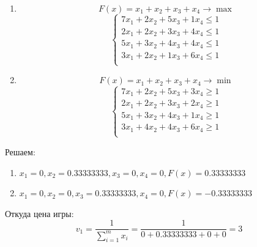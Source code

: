 \documentclass[9pt, a4paper]{article}
\begin{document}
    \begin{enumerate}
        \item
        \begin{equation}
            F(x) = x_1 + x_2 + x_3 + x_4 \rightarrow \max\label{eq:equation34}
        \end{equation}
        \begin{equation}
            \begin{cases}
                7x_1 + 2x_2 + 5x_3 + 1x_4 \leqslant 1\\
                2x_1 + 2x_2 + 3x_3 + 4x_4 \leqslant 1\\
                5x_1 + 3x_2 + 4x_3 + 4x_4 \leqslant 1\\
                3x_1 + 2x_2 + 1x_3 + 6x_4 \leqslant 1\\
            \end{cases}\label{eq:equation35}
        \end{equation}

        \item
        \begin{equation}
            F(x) = x_1 + x_2 + x_3 + x_4 \rightarrow \min\label{eq:equation36}
        \end{equation}
        \begin{equation}
            \begin{cases}
                7x_1 + 2x_2 + 5x_3 + 3x_4 \geqslant 1\\
                2x_1 + 2x_2 + 3x_3 + 2x_4 \geqslant 1\\
                5x_1 + 3x_2 + 4x_3 + 1x_4 \geqslant 1\\
                3x_1 + 4x_2 + 4x_3 + 6x_4 \geqslant 1\\
            \end{cases}\label{eq:equation37}
        \end{equation}
    \end{enumerate}

    Решаем:
    \begin{enumerate}
        \item $x_1 = 0, x_2 = 0.33333333, x_3 = 0, x_4 = 0, F(x) = 0.33333333$
        \item $x_1 = 0, x_2 = 0, x_3 = 0.33333333, x_4 = 0, F(x) = -0.33333333$
    \end{enumerate}

    Откуда цена игры:
    \begin{equation}
        v_1 = \frac{1}{\sum_{i=1}^m x_i} = \frac{1}{0 + 0.33333333 + 0 + 0} = 3\label{eq:equation38}
    \end{equation}
\end{document}
